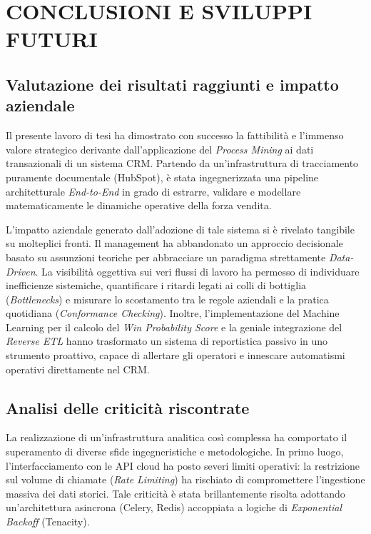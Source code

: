 \documentclass[12pt, a4paper]{report}
\begin{document}
\chapter{CONCLUSIONI E SVILUPPI FUTURI}

\section{Valutazione dei risultati raggiunti e impatto aziendale}
Il presente lavoro di tesi ha dimostrato con successo la fattibilità e l'immenso valore strategico derivante dall'applicazione del \textit{Process Mining} ai dati transazionali di un sistema CRM. Partendo da un'infrastruttura di tracciamento puramente documentale (HubSpot), è stata ingegnerizzata una pipeline architetturale \textit{End-to-End} in grado di estrarre, validare e modellare matematicamente le dinamiche operative della forza vendita.

L'impatto aziendale generato dall'adozione di tale sistema si è rivelato tangibile su molteplici fronti. Il management ha abbandonato un approccio decisionale basato su assunzioni teoriche per abbracciare un paradigma strettamente \textit{Data-Driven}. La visibilità oggettiva sui veri flussi di lavoro ha permesso di individuare inefficienze sistemiche, quantificare i ritardi legati ai colli di bottiglia (\textit{Bottlenecks}) e misurare lo scostamento tra le regole aziendali e la pratica quotidiana (\textit{Conformance Checking}). Inoltre, l'implementazione del Machine Learning per il calcolo del \textit{Win Probability Score} e la geniale integrazione del \textit{Reverse ETL} hanno trasformato un sistema di reportistica passivo in uno strumento proattivo, capace di allertare gli operatori e innescare automatismi operativi direttamente nel CRM.

\section{Analisi delle criticità riscontrate}
La realizzazione di un'infrastruttura analitica così complessa ha comportato il superamento di diverse sfide ingegneristiche e metodologiche. 
In primo luogo, l'interfacciamento con le API cloud ha posto severi limiti operativi: la restrizione sul volume di chiamate (\textit{Rate Limiting}) ha rischiato di compromettere l'ingestione massiva dei dati storici. Tale criticità è stata brillantemente risolta adottando un'architettura asincrona (Celery, Redis) accoppiata a logiche di \textit{Exponential Backoff} (Tenacity).
\end{document}

